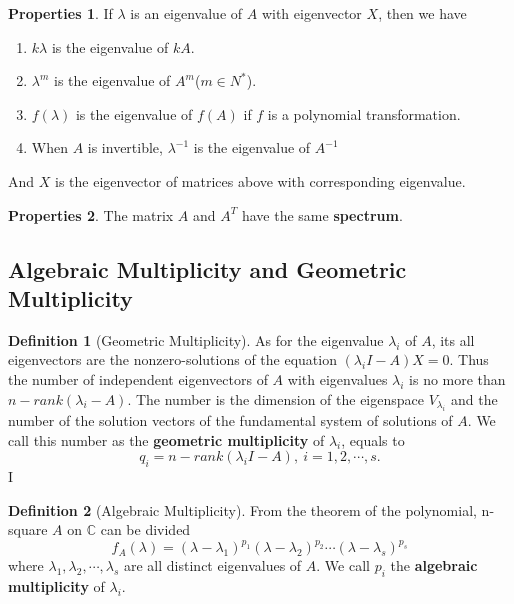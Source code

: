 \documentclass{article}
\theoremstyle{definition}
\newtheorem{defi}{Definition}[section]
\newtheorem{pro}{Properties}[section]
\begin{document}
\begin{pro}If $\lambda$ is an eigenvalue of $A$ with eigenvector $X$, then we have
    \begin{enumerate}

\item $k\lambda$ is the eigenvalue of $kA$.
\item $\lambda^{m}$ is the eigenvalue of $A^{m}$($m\in N^{*}$).
\item $f(\lambda)$ is the eigenvalue of $f(A)$ if $f$ is a polynomial transformation.
\item When $A$ is invertible, $\lambda^{-1}$ is the eigenvalue of $A^{-1}$
    \end{enumerate}
And $X$ is the eigenvector of matrices above with corresponding eigenvalue.

\end{pro}

\begin{pro}
The matrix $A$ and $A^{T}$ have the same \textbf{spectrum}.
\end{pro}

\subsection{Algebraic Multiplicity and Geometric Multiplicity}

\begin{defi}[Geometric Multiplicity]
As for the eigenvalue $\lambda_{i}$ of $A$, its all eigenvectors are the nonzero-solutions of the equation 
$(\lambda_{i}I-A)X=0$. Thus the number of independent eigenvectors of $A$ with eigenvalues $\lambda_{i}$ is 
no more than $n-rank(\lambda_{i}-A)$. The number is the dimension of the eigenspace $V_{\lambda_{i}}$ and the number 
of the solution vectors of the fundamental system of solutions of $A$. We call this number as the \textbf{geometric multiplicity} of $\lambda_{i}$, equals to 
$$q_{i}=n-rank(\lambda_{i}I-A),\ i=1,2,\cdots,s.$$I
\end{defi}

\begin{defi}[Algebraic Multiplicity]
From the theorem of the polynomial, n-square $A$ on $\mathbb{C}$ can be divided 
$$f_{A}(\lambda)=(\lambda-\lambda_{1})^{p_{1}}(\lambda-\lambda_{2})^{p_{2}}\cdots(\lambda-\lambda_{s})^{p_{s}}$$
where $\lambda_{1},\lambda_{2},\cdots,\lambda_{s}$ are all distinct eigenvalues of $A$. We call $p_{i}$ the \textbf{algebraic multiplicity} of $\lambda_{i}$.
\end{defi}
\end{document}
